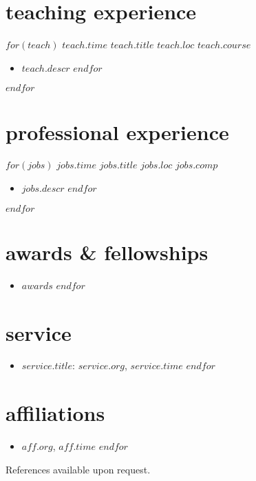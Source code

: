 \documentclass[]{friggeri-cv}
\begin{document}
\section{teaching experience}
\begin{entrylist}
$for(teach)$
  \entry
  {$teach.time$}
  {$teach.title$}
  {$teach.loc$}
  {$teach.course$}
  \setlength\parskip{0pt}
  \begin{itemize}[noitemsep, leftmargin=0.2in]
    $for(teach.descr)$
      \item $teach.descr$
    $endfor$
  \end{itemize}
  \setlength\parskip{12pt}
$endfor$
\end{entrylist}

\section{professional experience}
\begin{entrylist}
$for(jobs)$
  \entry
  {$jobs.time$}
  {$jobs.title$}
  {$jobs.loc$}
  {$jobs.comp$}
  \setlength\parskip{0pt}
  \begin{itemize}[noitemsep, leftmargin=0.2in]
    $for(jobs.descr)$
      \item $jobs.descr$
    $endfor$
  \end{itemize}
  \setlength\parskip{12pt}
$endfor$
\end{entrylist}



\section{awards \& fellowships}
\begin{itemize}[noitemsep, leftmargin=0.6in]
$for(awards)$
  \item $awards$
$endfor$
\end{itemize}



\section{service}
\begin{itemize}[noitemsep, leftmargin=0.6in]
$for(service)$
  \item $service.title$: $service.org$, $service.time$ 
$endfor$
\end{itemize}



\section{affiliations}
\begin{itemize}[noitemsep, leftmargin=0.6in]
$for(aff)$
  \item $aff.org$, $aff.time$
$endfor$
\end{itemize}



\vspace{0.2in}
References available upon request.
\end{document}
